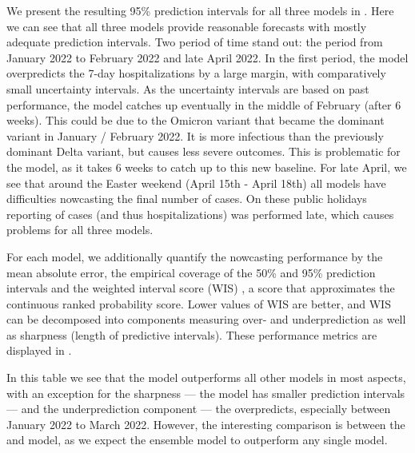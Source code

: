 We present the resulting 95\% prediction intervals for all three models in . Here we can see that all three models provide reasonable forecasts with mostly adequate prediction intervals. Two period of time stand out: the period from January 2022 to February 2022 and late April 2022. In the first period, the \ilmpropsmall model overpredicts the 7-day hospitalizations by a large margin, with comparatively small uncertainty intervals. As the uncertainty intervals are based on past performance, the model catches up eventually in the middle of February (after 6 weeks). This could be due to the Omicron variant that became the dominant variant in January / February 2022. It is more infectious than the previously dominant Delta variant, but causes less severe outcomes. This is problematic for the \ilmpropsmall model, as it takes $6$ weeks to catch up to this new baseline. For late April, we see that around the Easter weekend (April 15th - April 18th) all models have difficulties nowcasting the final number of cases. On these public holidays reporting of cases (and thus hospitalizations) was performed late, which causes problems for all three models.

For each model, we additionally quantify the nowcasting performance by the mean absolute error, the empirical coverage of the 50\% and 95\% prediction intervals and the weighted interval score (WIS) \citep{Bracher2021Evaluating}, a score that approximates the continuous ranked probability score. Lower values of WIS are better, and WIS can be decomposed into components measuring over- and underprediction as well as sharpness (length of predictive intervals). These performance metrics are displayed in .

\begin{table}
\centering

\caption{%
    Average nowcasting performance metrics of the three models for hospitalization. The weighted interval score (WIS) is additionally decomposed into sharpness and under/over-prediction (see \citep{Bracher2021Evaluating} and \citep[Section 2.5]{Wolffram2023Collaborative} for details). For each metric, the best value has been highlighted by boldface.%
}
\label{tab:df_table_performance}
\end{table}

In this table we see that the \ensemble model outperforms all other models in most aspects, with an exception for the sharpness --- the \ssm model has smaller prediction intervals --- and the underprediction component --- the \ilmpropsmall overpredicts, especially between January 2022 to March 2022.
However, the interesting comparison is between the \ilmpropsmall and \ssm model, as we expect the ensemble model to outperform any single model. 

